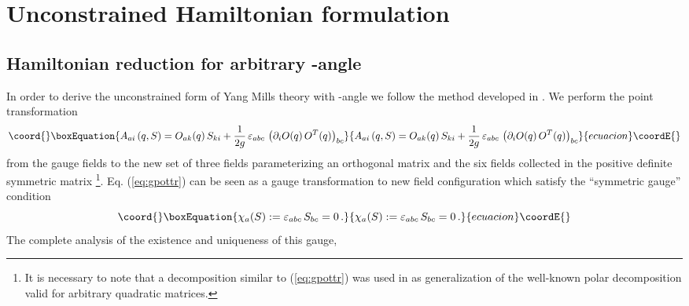 \documentclass[a4paper,12pt]{article}
\begin{document}

\section{Unconstrained Hamiltonian formulation}

\label{sec:unhf}


\subsection{Hamiltonian reduction for arbitrary \myHighlight{$\theta$}\coordHE{}-angle}

\label{sec:unhf1}

In order to derive the unconstrained form of \coordHE{} Yang Mills theory
with \myHighlight{$\theta$}\coordHE{}-angle we follow the method developed in \cite{KP} .
We perform the point transformation
\begin{equation}\coord{}\boxEquation{
\label{eq:gpottr}
A_{ai} \left(q, S \right) =
O_{ak}(q)\, S_{ki} +
\frac{1}{2 g} \,\varepsilon_{abc}\, \left(\partial_i O (q)\, O^T (q) \right)_{bc}
}{
A_{ai} \left(q, S \right) =
O_{ak}(q)\, S_{ki} +
\frac{1}{2 g} \,\varepsilon_{abc}\, \left(\partial_i O (q)\, O^T (q) \right)_{bc}
}{ecuacion}\coordE{}\end{equation}
from the gauge fields \coordHE{} to the new set of three
fields \coordHE{} parameterizing an orthogonal \coordHE{} matrix
\coordHE{} and the six fields \coordHE{}
collected in the positive definite symmetric \coordHE{} matrix \coordHE{}
\footnote{
It is necessary to note that a decomposition similar to (\ref{eq:gpottr})
was used in \cite{Simonov} as generalization of the well-known polar
decomposition valid for arbitrary quadratic matrices.}.
Eq. (\ref{eq:gpottr}) can be seen as a gauge transformation to
new field configuration \coordHE{} which satisfy the ``symmetric gauge''
condition
\begin{equation}\coord{}\boxEquation{
\label{symgauge}
\chi_a(S):= \varepsilon_{abc}\, S_{bc} = 0\,.
}{
\chi_a(S):= \varepsilon_{abc}\, S_{bc} = 0\,.
}{ecuacion}\coordE{}\end{equation}
The complete analysis of the existence and uniqueness of this gauge,
\end{document}
